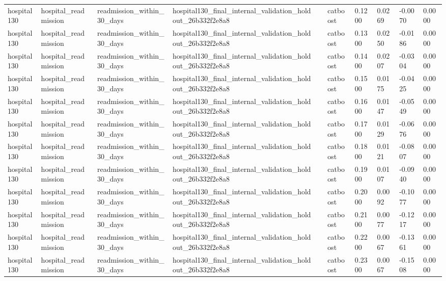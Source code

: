 \begin{tabular}{llllllllll}
hospital130 & hospital\_readmission & readmission\_within\_30\_days & hospital130\_final\_internal\_validation\_holdout\_26b332f2e8a8 &  & catboost & 0.1200 & 0.0269 & -0.0070 & 0.0000 \\
hospital130 & hospital\_readmission & readmission\_within\_30\_days & hospital130\_final\_internal\_validation\_holdout\_26b332f2e8a8 &  & catboost & 0.1300 & 0.0250 & -0.0186 & 0.0000 \\
hospital130 & hospital\_readmission & readmission\_within\_30\_days & hospital130\_final\_internal\_validation\_holdout\_26b332f2e8a8 &  & catboost & 0.1400 & 0.0207 & -0.0304 & 0.0000 \\
hospital130 & hospital\_readmission & readmission\_within\_30\_days & hospital130\_final\_internal\_validation\_holdout\_26b332f2e8a8 &  & catboost & 0.1500 & 0.0175 & -0.0425 & 0.0000 \\
hospital130 & hospital\_readmission & readmission\_within\_30\_days & hospital130\_final\_internal\_validation\_holdout\_26b332f2e8a8 &  & catboost & 0.1600 & 0.0147 & -0.0549 & 0.0000 \\
hospital130 & hospital\_readmission & readmission\_within\_30\_days & hospital130\_final\_internal\_validation\_holdout\_26b332f2e8a8 &  & catboost & 0.1700 & 0.0129 & -0.0676 & 0.0000 \\
hospital130 & hospital\_readmission & readmission\_within\_30\_days & hospital130\_final\_internal\_validation\_holdout\_26b332f2e8a8 &  & catboost & 0.1800 & 0.0121 & -0.0807 & 0.0000 \\
hospital130 & hospital\_readmission & readmission\_within\_30\_days & hospital130\_final\_internal\_validation\_holdout\_26b332f2e8a8 &  & catboost & 0.1900 & 0.0107 & -0.0940 & 0.0000 \\
hospital130 & hospital\_readmission & readmission\_within\_30\_days & hospital130\_final\_internal\_validation\_holdout\_26b332f2e8a8 &  & catboost & 0.2000 & 0.0092 & -0.1077 & 0.0000 \\
hospital130 & hospital\_readmission & readmission\_within\_30\_days & hospital130\_final\_internal\_validation\_holdout\_26b332f2e8a8 &  & catboost & 0.2100 & 0.0077 & -0.1217 & 0.0000 \\
hospital130 & hospital\_readmission & readmission\_within\_30\_days & hospital130\_final\_internal\_validation\_holdout\_26b332f2e8a8 &  & catboost & 0.2200 & 0.0067 & -0.1361 & 0.0000 \\
hospital130 & hospital\_readmission & readmission\_within\_30\_days & hospital130\_final\_internal\_validation\_holdout\_26b332f2e8a8 &  & catboost & 0.2300 & 0.0067 & -0.1508 & 0.0000 \\

\end{tabular}
